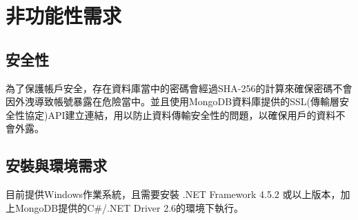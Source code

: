 \documentclass{scrreprt}
\begin{document}
\begin{CJK}{UTF8}{bkai}
\chapter{非功能性需求}

\section{安全性}
\qquad 為了保護帳戶安全，存在資料庫當中的密碼會經過SHA-256的計算來確保密碼不會因外洩導致帳號暴露在危險當中。並且使用MongoDB資料庫提供的SSL(傳輸層安全性協定)API建立連結，用以防止資料傳輸安全性的問題，以確保用戶的資料不會外露。

\section{安裝與環境需求}
\qquad 目前提供Windows作業系統，且需要安裝 .NET Framework 4.5.2 或以上版本，加上MongoDB提供的C\#/.NET Driver 2.6的環境下執行。
\chapter{}
\end{CJK}
\end{document}
